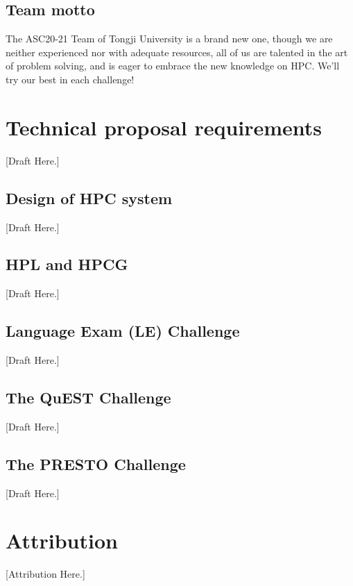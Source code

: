 \documentclass[a4paper, 11pt]{article}
\begin{document}
		\subsection{Team motto} 
		
			The ASC20-21 Team of Tongji University is a brand new one, though we are neither experienced nor with adequate resources, all of us are talented in the art of problem solving, and is eager to embrace the new knowledge on HPC. We’ll try our best in each challenge!
		
		
	\section{Technical proposal requirements}
		[Draft Here.]
		\subsection{Design of HPC system} [Draft Here.]
		\subsection{HPL and HPCG} [Draft Here.]
		\subsection{Language Exam (LE) Challenge} [Draft Here.]
		\subsection{The QuEST Challenge} [Draft Here.]
		\subsection{The PRESTO Challenge} [Draft Here.]

	\section*{Attribution} [Attribution Here.]



\end{document}
